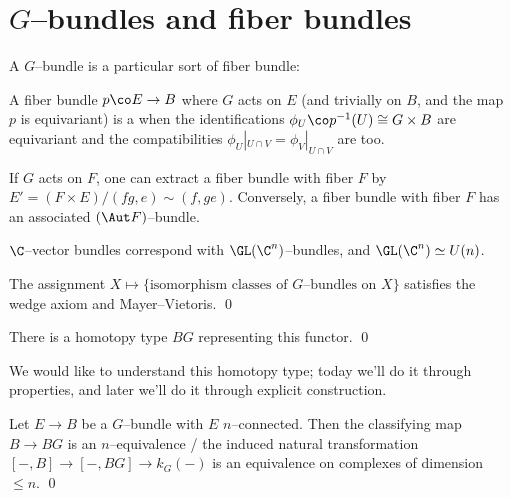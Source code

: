 \section{$G$--bundles and fiber bundles}

A $G$--bundle is a particular sort of fiber bundle:

\begin{definition}
A fiber bundle $p\co E \to B$ where $G$ acts on $E$ (and trivially on $B$, and the map $p$ is equivariant) is a  when the identifications $\phi_U\co p^{-1}(U) \cong G \times B$ are equivariant and the compatibilities $\phi_U|_{U \cap V} = \phi_V|_{U \cap V}$ are too.
\end{definition}

\begin{remark}
If $G$ acts on $F$, one can extract a fiber bundle with fiber $F$ by $E' = (F \times E) / (fg, e) \sim (f, ge)$.  Conversely, a fiber bundle with fiber $F$ has an associated $(\Aut F)$--bundle.
\end{remark}

\begin{remark}
$\C$--vector bundles correspond with $\GL(\C^n)$--bundles, and $\GL(\C^n) \simeq U(n)$.
\end{remark}

\begin{lemma}
The assignment $X \mapsto \{\text{isomorphism classes of $G$--bundles on $X$}\}$ satisfies the wedge axiom and Mayer--Vietoris. \qed
\end{lemma}

\begin{corollary}
There is a homotopy type $BG$ representing this functor. \qed
\end{corollary}

We would like to understand this homotopy type; today we'll do it through properties, and later we'll do it through explicit construction.

\begin{lemma}
Let $E \to B$ be a $G$--bundle with $E$ $n$--connected.  Then the classifying map $B \to BG$ is an $n$--equivalence / the induced natural transformation $[-, B] \to [-, BG] \to k_G(-)$ is an equivalence on complexes of dimension $\le n$. \qed 
\end{lemma}

